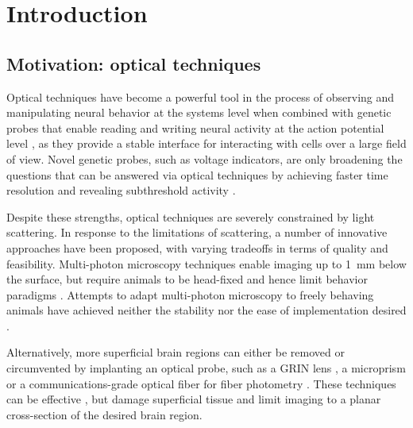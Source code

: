 \chapter{Introduction}
\label{chapter:intro}

\thispagestyle{myheadings}

\section{Motivation: optical techniques}
\label{sec:history}

Optical techniques have become a powerful tool in the process of observing and manipulating
neural behavior at the systems level when combined with genetic probes that enable reading 
and writing neural 
activity at the action potential level \cite{Emiliani:2015jl}, as they provide a stable 
interface for interacting with 
cells over a large field of view. Novel genetic probes, such as voltage 
indicators, are only broadening the questions that can be answered via optical techniques by achieving
faster time resolution and revealing subthreshold activity \cite{Gong:2015is}.

Despite these strengths, optical techniques are severely constrained by light scattering. In response to the limitations of scattering, 
a number of innovative approaches have been proposed, with varying tradeoffs in terms of quality and
feasibility. Multi-photon microscopy techniques enable imaging up to 1~mm below the surface, but
require animals to be head-fixed and hence limit behavior paradigms \cite{Horton:2013gxa}. 
Attempts to adapt multi-photon microscopy to freely behaving animals have achieved neither the
stability nor the ease of implementation desired \cite{Helmchen:2001tw,Flusberg:2005tq}.

Alternatively, more superficial brain regions can either be removed \cite{Dombeck:2010jr} or circumvented
by implanting an optical probe, such as a GRIN lens \cite{Barretto:2009hk}, a microprism \cite{Andermann:2013kc}
or a communications-grade optical fiber for fiber photometry \cite{Guo:2015gu}. These techniques can be 
effective \cite{Betley:2015cn}, but damage superficial tissue and limit imaging to a planar cross-section 
of the desired brain region. 

